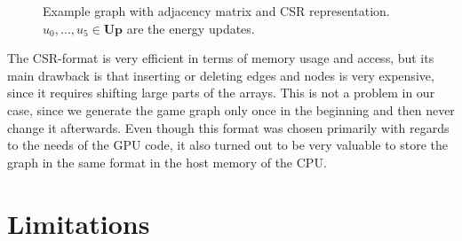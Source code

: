 \begin{figure}[h]
\begin{center}
\end{center}
\caption{Example graph with adjacency matrix and CSR representation.
    $u_0, \ldots, u_5 \in \mathbf{Up}$ are the energy updates.
}%
\label{fig:csr}
\end{figure}

The CSR-format is very efficient in terms of memory usage and access,
but its main drawback is that inserting or deleting edges and nodes is very
expensive, since it requires shifting large parts of the arrays.
This is not a problem in our case, since we generate the game graph only once
in the beginning and then never change it afterwards.
Even though this format was chosen primarily with regards to the needs
of the GPU code, it also turned out to be very valuable to store the graph in
the same format in the host memory of the CPU.\@


\section{Limitations}


